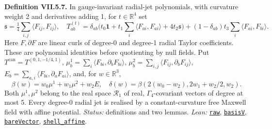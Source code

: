 \documentclass[
  letterpaper,
  11pt]{article}
\begin{document}
\textbf{Definition VII.5.7.} In gauge-invariant radial-jet polynomials,
with curvature weight 2 and derivatives adding 1, for
\(t\in\mathbb R^4\) set
\[\mathfrak s=\tfrac14\sum_{i,j}\langle F_{ij},F_{ij}\rangle,\quad T^{(t)}_{ab}=\delta_{ab}\bigl(t_0\mathbf1+t_1\sum_i\langle F_{ai},F_{ai}\rangle+4t_2\mathfrak s\bigr)+(1-\delta_{ab})t_3\sum_i\langle F_{ai},F_{bi}\rangle.\]
Here \(F,\partial F\) are linear curls of degree-0 and degree-1 radial
Taylor coefficients. These are polynomial identities before quotienting
by null fields. Put \(T^{\mathrm{can}}=T^{(0,1,-1/4,1)}\),
\(\mu^1_b=\sum_i\langle F_{bi},\partial_bF_{bi}\rangle\),
\(\mu^2_b=\sum_{i,j}\langle F_{ij},\partial_bF_{ij}\rangle\),
\(E_b=\sum_{a,i}\langle F_{bi},\partial_aF_{ai}\rangle\), and, for
\(w\in\mathbb R^3\),
\[\beta(w)=w_0\mu^1+w_1\mu^2+w_2E,\quad\delta(w)=\beta(2(w_0-w_2),2w_1+w_2/2,w_2).\]
Both \(\mu^1,\mu^2\) belong to the real space \(\mathcal R_1\) of real,
\(\Gamma_4\)-covariant vectors of degree at most 5. Every degree-0
radial jet is realised by a constant-curvature free Maxwell field with
affine potential. \emph{Status:} definitions and two lemmas.
\emph{Lean:}
\href{https://github.com/yang-mills-group/OpenAI-YM-20261028/blob/3456e5e75cf8d4cd558955a5c7638fba2d68f464/YM/TraceExtension/Foundation/Dilate.lean\#L70}{\texttt{raw}},
\href{https://github.com/yang-mills-group/OpenAI-YM-20261028/blob/3456e5e75cf8d4cd558955a5c7638fba2d68f464/YM/TraceExtension/Foundation/Caps.lean\#L63-L66}{\texttt{basisV}},
\href{https://github.com/yang-mills-group/OpenAI-YM-20261028/blob/3456e5e75cf8d4cd558955a5c7638fba2d68f464/YM/TraceExtension/Foundation/Dilate.lean\#L33}{\texttt{bareVector}},
\href{https://github.com/yang-mills-group/OpenAI-YM-20261028/blob/3456e5e75cf8d4cd558955a5c7638fba2d68f464/YM/TraceExtension/Foundation/Caps.lean\#L43-L50}{\texttt{shell\_affine}}.
\end{document}

